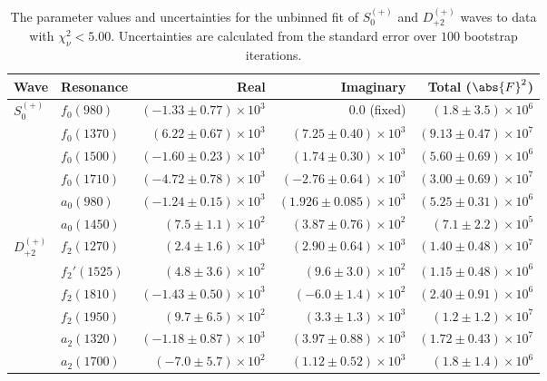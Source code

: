 \begin{table}[ht]
    \begin{center}
        \begin{tabular}{llrrr}\toprule
        Wave & Resonance & Real & Imaginary & Total ($\abs{F}^2$) \\\midrule
$S_{0}^{(+)}$ & $f_{0}(980)$ & $(-1.33 \pm 0.77) \times 10^{3}$ & $0.0$ (fixed) & $(1.8 \pm 3.5) \times 10^{6}$ \\
 & $f_{0}(1370)$ & $(6.22 \pm 0.67) \times 10^{3}$ & $(7.25 \pm 0.40) \times 10^{3}$ & $(9.13 \pm 0.47) \times 10^{7}$ \\
 & $f_{0}(1500)$ & $(-1.60 \pm 0.23) \times 10^{3}$ & $(1.74 \pm 0.30) \times 10^{3}$ & $(5.60 \pm 0.69) \times 10^{6}$ \\
 & $f_{0}(1710)$ & $(-4.72 \pm 0.78) \times 10^{3}$ & $(-2.76 \pm 0.64) \times 10^{3}$ & $(3.00 \pm 0.69) \times 10^{7}$ \\
 & $a_{0}(980)$ & $(-1.24 \pm 0.15) \times 10^{3}$ & $(1.926 \pm 0.085) \times 10^{3}$ & $(5.25 \pm 0.31) \times 10^{6}$ \\
 & $a_{0}(1450)$ & $(7.5 \pm 1.1) \times 10^{2}$ & $(3.87 \pm 0.76) \times 10^{2}$ & $(7.1 \pm 2.2) \times 10^{5}$ \\
$D_{+2}^{(+)}$ & $f_{2}(1270)$ & $(2.4 \pm 1.6) \times 10^{3}$ & $(2.90 \pm 0.64) \times 10^{3}$ & $(1.40 \pm 0.48) \times 10^{7}$ \\
 & $f_{2}'(1525)$ & $(4.8 \pm 3.6) \times 10^{2}$ & $(9.6 \pm 3.0) \times 10^{2}$ & $(1.15 \pm 0.48) \times 10^{6}$ \\
 & $f_{2}(1810)$ & $(-1.43 \pm 0.50) \times 10^{3}$ & $(-6.0 \pm 1.4) \times 10^{2}$ & $(2.40 \pm 0.91) \times 10^{6}$ \\
 & $f_{2}(1950)$ & $(9.7 \pm 6.5) \times 10^{2}$ & $(3.3 \pm 1.3) \times 10^{3}$ & $(1.2 \pm 1.2) \times 10^{7}$ \\
 & $a_{2}(1320)$ & $(-1.18 \pm 0.87) \times 10^{3}$ & $(3.97 \pm 0.88) \times 10^{3}$ & $(1.72 \pm 0.43) \times 10^{7}$ \\
 & $a_{2}(1700)$ & $(-7.0 \pm 5.7) \times 10^{2}$ & $(1.12 \pm 0.52) \times 10^{3}$ & $(1.8 \pm 1.4) \times 10^{6}$ \\\bottomrule
        \end{tabular}
    \caption{The parameter values and uncertainties for the unbinned fit of $S_{0}^{(+)}$ and $D_{+2}^{(+)}$ waves to data with $\chi^2_\nu < 5.00$. Uncertainties are calculated from the standard error over $100$ bootstrap iterations.}\label{tab:unbinned-fit-chisqdof-5.0-Sp0p-Dp2p}
    \end{center}
\end{table}
